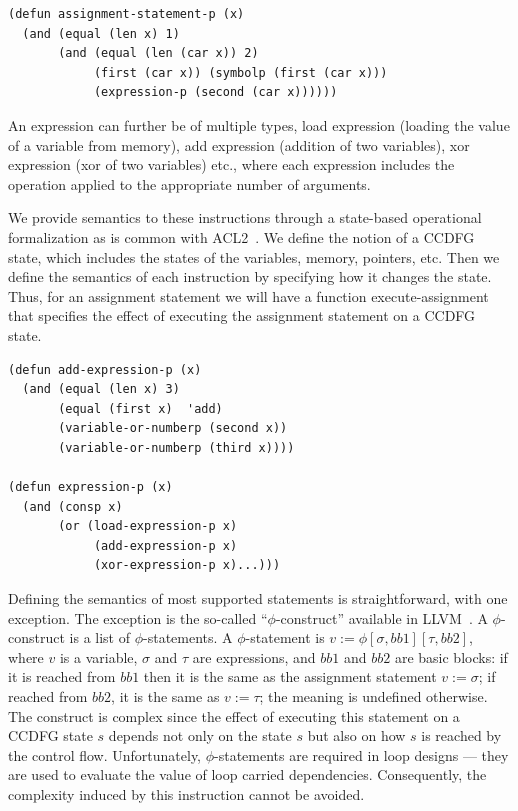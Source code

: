 \small
\begin{verbatim}
(defun assignment-statement-p (x)
  (and (equal (len x) 1)
       (and (equal (len (car x)) 2)
            (first (car x)) (symbolp (first (car x)))
            (expression-p (second (car x))))))
\end{verbatim}
\normalsize

An expression can further be of multiple types, %
load
expression (loading the value of a variable from memory), add
expression (addition of two variables), xor expression (xor of two variables)
etc., where each expression includes the operation applied to the
appropriate number of arguments.

We provide semantics to these instructions through a
state-based operational formalization as is common with
ACL2~\cite{liu}. We define the notion of a CCDFG state, which includes
the states of the variables, memory, pointers, etc.  Then we
define the semantics of each instruction by specifying how
it changes the state.  Thus, for an assignment statement we
will have a function execute-assignment that specifies
the effect of executing the assignment statement on a CCDFG
state.

\small
\begin{verbatim}
(defun add-expression-p (x)
  (and (equal (len x) 3)
       (equal (first x)  'add)
       (variable-or-numberp (second x))
       (variable-or-numberp (third x))))

(defun expression-p (x)
  (and (consp x)
       (or (load-expression-p x) 
       		(add-expression-p x) 
       		(xor-expression-p x)...)))
\end{verbatim}
\normalsize

Defining the semantics of most supported statements is
straightforward, with one exception.  The exception is the
so-called ``$\phi$-construct'' available in LLVM~\cite{llvmphi}. 
A
$\phi$-construct is a list of $\phi$-statements.  A
$\phi$-statement is $v := \phi [\sigma, bb1] [\tau, bb2]$,
where $v$ is a variable, $\sigma$ and $\tau$ are
expressions, and $bb1$ and $bb2$ are basic blocks: if it is
reached from $bb1$ then it is the same as the assignment
statement $v := \sigma$; if reached from $bb2$, it is the
same as $v := \tau$; the meaning is undefined otherwise. The
construct is complex since the effect of executing this
statement on a CCDFG state $s$ depends not only on the state
$s$ but also on how $s$ is reached by the control flow.
Unfortunately, $\phi$-statements are required in loop designs ---
they are used to evaluate the value of loop carried dependencies.
Consequently, the complexity induced
by this instruction cannot be avoided.

